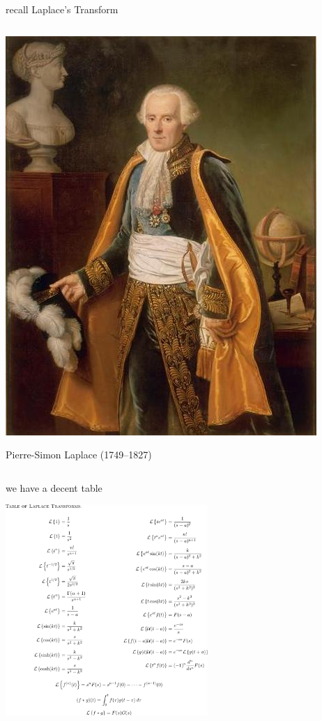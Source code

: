 \documentclass[urlcolor=blue,dvipsnames]{beamer}
\begin{document}
\begin{frame}{recall Laplace's Transform}
\begin{columns}
\begin{column}{0.23\textwidth}
\vspace{3mm}
\includegraphics[width=\textwidth]{figs/Laplace-grand}

\tiny
Pierre-Simon Laplace (1749--1827) 
\end{column}
\end{columns}
\end{frame}


\begin{frame}{we have a decent table}

\vspace{-2mm}
\begin{center}
\includegraphics[height=80mm]{figs/fulllaplacetable}
\end{center}
\end{frame}
\end{document}
